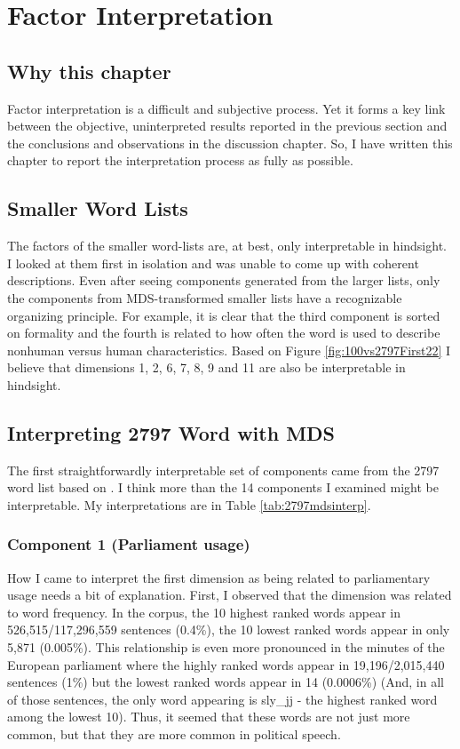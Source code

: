 \chapter{Factor Interpretation}

\section{Why this chapter}

Factor interpretation is a difficult and subjective process. Yet it forms a key
link between the objective, uninterpreted results reported in the previous 
section and the conclusions and observations in the discussion chapter. So, I
have written this chapter to report the interpretation process as fully as 
possible.

\section{Smaller Word Lists}

The factors of the smaller word-lists are, at best, only interpretable in 
hindsight. I looked at them first in isolation and was unable to
come up with coherent descriptions. Even after seeing components generated from
the larger lists, only the components from MDS-transformed smaller lists have 
a recognizable organizing principle. For example, it is clear that the third 
component is sorted on formality and the fourth is related to how often the 
word is used to describe nonhuman versus human characteristics. Based on Figure 
\ref{fig:100vs2797First22} I believe that dimensions 1, 2, 6, 7, 8, 9 and 11
are also be interpretable in hindsight.

\section{Interpreting 2797 Word with MDS}

The first straightforwardly interpretable set of components came from the 2797 
word list based on \citep{Norman1967}. I think more than the 14 components I 
examined might be interpretable. My interpretations are in Table
\ref{tab:2797mdsinterp}.

\subsection{Component 1 (Parliament usage)}

How I came to interpret the first dimension as being related to parliamentary 
usage needs a bit of explanation. First, I observed that the dimension was 
related to word frequency. In the corpus, the 10 highest ranked words appear in 
526,515/117,296,559 sentences (0.4\%), the 10 lowest ranked words appear in only 
5,871 (0.005\%). This relationship is even more pronounced in the minutes of the 
European parliament where the highly ranked words appear in 19,196/2,015,440 
sentences (1\%) but the lowest ranked words appear in 14 (0.0006\%) (And, in all 
of those sentences, the only word appearing is sly\_jj - the highest ranked word 
among the lowest 10). Thus, it seemed that these words are not just more common, 
but that they are more common in political speech.

